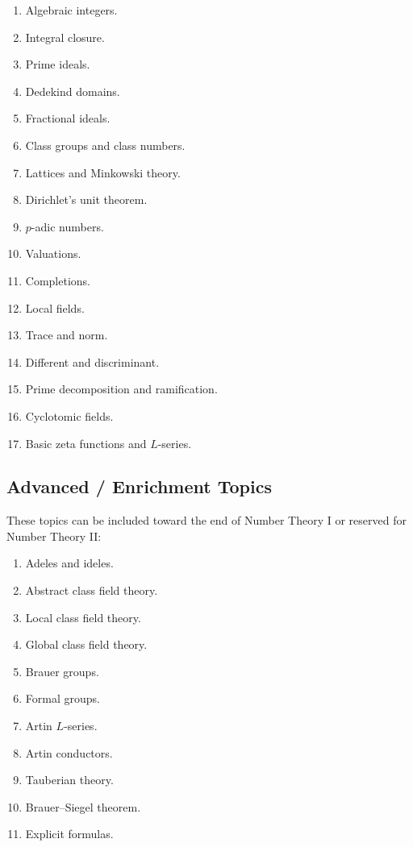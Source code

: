 \documentclass[11pt,a4paper]{article}
\begin{document}
\begin{enumerate}
    \item Algebraic integers.
    \item Integral closure.
    \item Prime ideals.
    \item Dedekind domains.
    \item Fractional ideals.
    \item Class groups and class numbers.
    \item Lattices and Minkowski theory.
    \item Dirichlet's unit theorem.
    \item \(p\)-adic numbers.
    \item Valuations.
    \item Completions.
    \item Local fields.
    \item Trace and norm.
    \item Different and discriminant.
    \item Prime decomposition and ramification.
    \item Cyclotomic fields.
    \item Basic zeta functions and \(L\)-series.
\end{enumerate}

\subsection{Advanced / Enrichment Topics}

These topics can be included toward the end of Number Theory I
or reserved for Number Theory II:

\begin{enumerate}
    \item Adeles and ideles.
    \item Abstract class field theory.
    \item Local class field theory.
    \item Global class field theory.
    \item Brauer groups.
    \item Formal groups.
    \item Artin \(L\)-series.
    \item Artin conductors.
    \item Tauberian theory.
    \item Brauer--Siegel theorem.
    \item Explicit formulas.
\end{enumerate}
\end{document}
